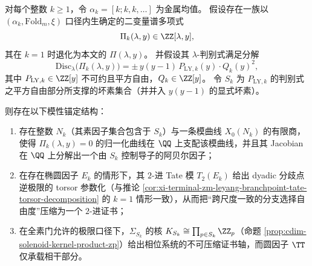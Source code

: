 \begin{conjecture}\label{conj:xi-metallic-mean-leyang-modular-anchor}
对每个整数 \(k\ge 1\)，令 \(\alpha_k=[k;k,k,\dots]\) 为金属均值。
假设存在一族以 \((\alpha_k,\mathrm{Fold}_m,\xi)\) 口径内生确定的二变量谱多项式
\[
\Pi_k(\lambda,y)\in \ZZ[\lambda,y],
\]
其在 \(k=1\) 时退化为本文的 \(\Pi(\lambda,y)\)。
并假设其 \(\lambda\)-判别式满足分解
\[
\mathrm{Disc}_{\lambda}\bigl(\Pi_k(\lambda,y)\bigr)
=\pm\,y(y-1)\,P_{\mathrm{LY},k}(y)\cdot Q_k(y)^{2},
\]
其中 \(P_{\mathrm{LY},k}\in\ZZ[y]\) 不可约且平方自由，\(Q_k\in\ZZ[y]\)。
令 \(S_k\) 为 \(P_{\mathrm{LY},k}\) 的判别式之平方自由部分所支撑的坏素集合（并并入 \(y(y-1)\) 的显式坏素）。
\par
则存在以下模性锚定结构：
\begin{enumerate}
  \item 存在整数 \(N_k\)（其素因子集合包含于 \(S_k\)）与一条模曲线 \(X_0(N_k)\) 的有限商，使得 \(\Pi_k(\lambda,y)=0\) 的归一化曲线在 \(\QQ\) 上支配该模曲线，并且其 Jacobian 在 \(\QQ\) 上分解出一个由 \(S_k\) 控制导子的阿贝尔因子；
  \item 在存在椭圆因子 \(E_k\) 的情形下，其 \(2\)-进 Tate 模 \(T_2(E_k)\) 给出 dyadic 分歧点逆极限的 torsor 参数化（与推论 \ref{cor:xi-terminal-zm-leyang-branchpoint-tate-torsor-decomposition} 的 \(k=1\) 情形一致），从而把“跨尺度一致的分支选择自由度”压缩为一个 \(2\)-进证书；
  \item 在全素门允许的极限口径下，\(\Sigma_{S_k}\) 的核 \(K_{S_k}\cong \prod_{p\in S_k}\ZZ_p\)（命题 \ref{prop:cdim-solenoid-kernel-product-zp}）给出相位系统的不可压缩证书轴，而圆因子 \(\TT\) 仅承载相干部分。
\end{enumerate}
\end{conjecture}

\endinput

